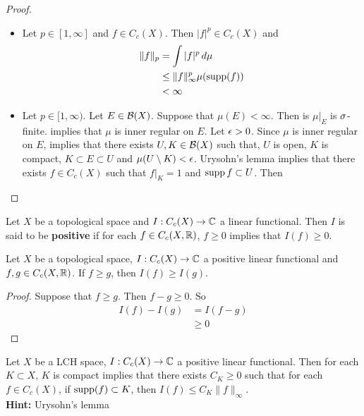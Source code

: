 \documentclass{book}
\begin{document}
	\begin{proof}\
		\begin{itemize}
			\item Let $p \in [1, \infty]$ and $f \in C_c(X)$. Then $|f|^p \in C_c(X)$ and 
			\begin{align*}
				\|f\|_p 
				&= \int |f|^p \, d \mu \\
				& \leq \|f\|_{\infty}^p \mu(\operatorname{supp} (f)) \\
				& < \infty
			\end{align*}	 
			\item Let $p \in [1, \infty)$. Let $E \in \mathcal{B}(X)$. Suppose that $\mu(E) < \infty$. Then is $\mu|_E$ is $\sigma$-finite.  implies that $\mu$ is inner regular on $E$. Let $\epsilon > 0$. Since $\mu$ is inner regular on $E$,  implies that there exists $U,K \in \mathcal{B}(X)$ such that, $U$ is open, $K$ is compact, $K \subset E \subset U$ and  $\mu(U \setminus K) < \epsilon$. Urysohn's lemma implies that there exists $f \in C_c(X)$ such that $f|_K = 1$ and $\operatorname{supp} f \subset U$. Then \\
			\tcb{FINISH!!!}
		\end{itemize}
	\end{proof}
	
	\begin{defn}  
		Let $X$ be a topological space and $I: C_c(X) \rightarrow \mathbb{C}$ a linear functional. Then $I$ is said to be \textbf{positive} if for each $f \in C_c(X, \mathbb{R})$, $f \geq 0 $ implies that $I(f) \geq 0$.
	\end{defn}
	
	\begin{ex}  
		Let $X$ be a topological space, $I: C_c(X) \rightarrow \mathbb{C}$ a positive linear functional and $f,g \in C_c(X, \mathbb{R})$. If $f \geq g$, then $I(f) \geq I (g)$.  
	\end{ex}	
	
	\begin{proof}
		Suppose that $f \geq g$. Then $f - g \geq 0$. So 
		\begin{align*}
			I(f) - I(g) 
			&= I(f -g) \\
			&\geq 0
		\end{align*}
	\end{proof}
	
	
	
	\begin{ex}  
		Let $X$ be a LCH space, $I: C_c(X) \rightarrow \mathbb{C}$ a positive linear functional. Then for each $K \subset X$, $K $ is compact implies that there exists $C_K \geq 0$ such that for each $f \in C_c(X)$, if $\operatorname{supp}(f) \subset K$, then $I(f) \leq C_K \|f\|_{\infty}$.\\
		\textbf{Hint:} Urysohn's lemma 
	\end{ex}
	
\end{document}
